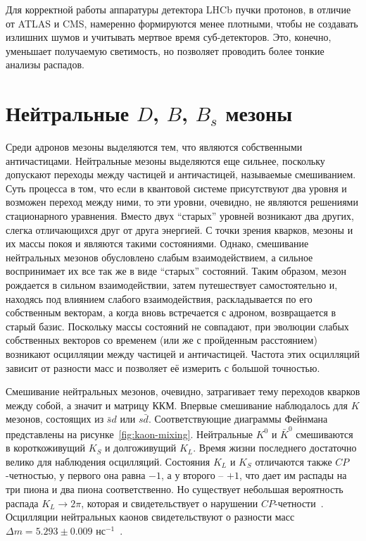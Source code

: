 \documentclass[a4paper, 10pt, twocolumn]{article}
\begin{document}
Для корректной работы аппаратуры детектора LHCb пучки протонов, 
в отличие от ATLAS и CMS, намеренно формируются менее плотными, чтобы 
не создавать излишних шумов и учитывать мертвое время суб-детекторов. 
Это, конечно, уменьшает получаемую светимость, но позволяет проводить 
более тонкие анализы распадов.


\section{Нейтральные $D$, $B$, $B_s$ мезоны}

Среди адронов мезоны выделяются тем, что являются собственными 
античастицами. Нейтральные мезоны выделяются еще сильнее, поскольку 
допускают переходы между частицей и античастицей, называемые 
смешиванием. Суть процесса в том, что если в квантовой системе 
присутствуют два уровня и возможен переход между ними, то эти уровни, 
очевидно, не являются решениями стационарного уравнения. Вместо двух 
``старых'' уровней возникают два других, слегка отличающихся друг от 
друга энергией. С точки зрения кварков, мезоны и их массы покоя 
и являются такими состояниями. Однако, смешивание нейтральных мезонов 
обусловлено слабым взаимодействием, а сильное воспринимает их все так 
же в виде ``старых'' состояний. Таким образом, мезон рождается 
в сильном взаимодействии, затем путешествует самостоятельно и, находясь 
под влиянием слабого взаимодействия, раскладывается по его собственным 
векторам, а когда вновь встречается с адроном, возвращается в старый 
базис. Поскольку массы состояний не совпадают, при эволюции слабых 
собственных векторов со временем (или же с пройденным расстоянием) 
возникают осцилляции между частицей и античастицей. Частота этих 
осцилляций зависит от разности масс и позволяет её измерить с большой 
точностью.

Смешивание нейтральных мезонов, очевидно, затрагивает тему переходов 
кварков между собой, а значит и матрицу ККМ. Впервые смешивание 
наблюдалось для $K$ мезонов, состоящих из $\bar{s}d$ или $s\bar{d}$. 
Соответствующие диаграммы Фейнмана представлены на 
рисунке~\ref{fig:kaon-mixing}. Нейтральные $K^0$ и $\bar{K}^0$ 
смешиваются в короткоживущий $K_S$ и долгоживущий $K_L$. Время жизни 
последнего достаточно велико для наблюдения осцилляций. Состояния $K_L$ 
и $K_S$ отличаются также $CP$-четностью, у первого она равна $-1$, 
а у второго -- $+1$, что дает им распады на три пиона и два пиона 
соответственно. Но существует небольшая вероятность распада $K_L \to 
2\pi$, которая и свидетельствует о нарушении 
$CP$-четности~\cite{kaon-CP-violation}. Осцилляции нейтральных каонов 
свидетельствуют о разности масс $\Delta m = 5.293 \pm 0.009 
\text{~нс}^{-1}$~\cite{kaon-oscillations}.
\end{document}

